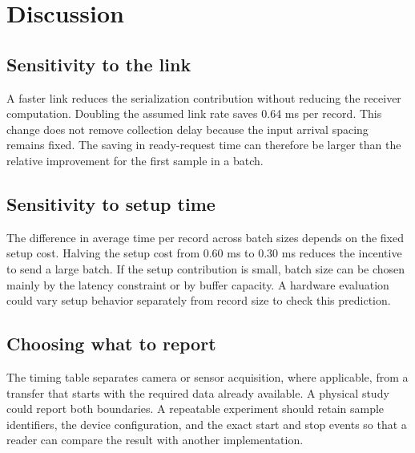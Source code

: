 \SampleColumnBreak

\section{Discussion}

\subsection{Sensitivity to the link}

A faster link reduces the serialization contribution without reducing the receiver computation. Doubling the assumed link rate saves 0.64 ms per record. This change does not remove collection delay because the input arrival spacing remains fixed. The saving in ready-request time can therefore be larger than the relative improvement for the first sample in a batch.

\subsection{Sensitivity to setup time}

The difference in average time per record across batch sizes depends on the fixed setup cost. Halving the setup cost from 0.60 ms to 0.30 ms reduces the incentive to send a large batch. If the setup contribution is small, batch size can be chosen mainly by the latency constraint or by buffer capacity. A hardware evaluation could vary setup behavior separately from record size to check this prediction.

\subsection{Choosing what to report}

The timing table separates camera or sensor acquisition, where applicable, from a transfer that starts with the required data already available. A physical study could report both boundaries. A repeatable experiment should retain sample identifiers, the device configuration, and the exact start and stop events so that a reader can compare the result with another implementation.
